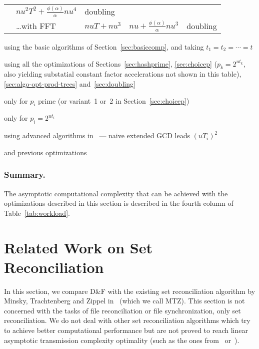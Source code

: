 \documentclass[twoside,envcountsame,runningheads]{llncs}
\newcommand{\df}{D\&F\xspace}
\begin{document}
\begin{table}[t]
\begin{threeparttable}
\begin{tabularx}{\textwidth}{lXC{2.3cm}C{2.5cm}l}
      & $n u^2 T^2 + \frac{\phi(\alpha)}{\alpha} n u^4$
      & doubling \\
      & \dots with FFT
      & $n u T + n u^3$
      & $n u + \frac{\phi(\alpha)}{\alpha} n u^3$
      & doubling \\
\bottomrule
  \end{tabularx}
  \begin{tablenotes}
    \item[a] using the basic algorithms of Section~\ref{sec:basiccomp}, and taking $t_1=t_2=\cdots=t$
    \item[b] using all the optimizations of Sections~\ref{sec:hashprime}, \ref{sec:choicep} ($p_k = 2^{ut_k}$, also yielding substatial constant factor accelerations not shown in this table), \ref{sec:algo-opt-prod-trees} and~\ref{sec:doubling}
    \item[c] only for $p_i$ prime (or variant~1 or~2 in Section~\ref{sec:choicep})
    \item[d] only for $p_i = 2^{ut_i}$
    \item[e] using advanced algorithms in~\cite{pan2004rational,wang2003acceleration} --- naive extended GCD leads $(uT_i)^2$
    \item[f] and previous optimizations\smallskip
  \end{tablenotes}
 \end{threeparttable}
\end{table}

\subsubsection{Summary.}

The asymptotic computational complexity that can be achieved with the optimizations described in this section is described in the fourth column of Table~\ref{tab:workload}.



\section{Related Work on Set Reconciliation}
\label{sec:related-work}

In this section, we compare \df with the existing set reconciliation algorithm by Minsky, Trachtenberg and Zippel in~\cite{Mins1} (which
we call MTZ). This section is not concerned with the tasks of file reconciliation or file
synchronization, only set reconciliation. 
We do not deal with other set reconciliation algorithms which try to achieve better
computational performance but are not proved to reach linear asymptotic
transmission complexity optimality (such as the ones from~\cite{Whats}
or~\cite{byers}).
\end{document}
